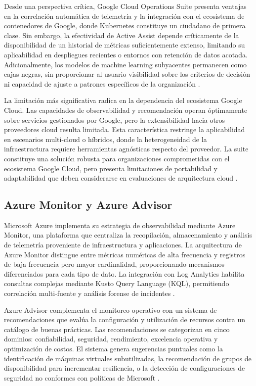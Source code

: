 Desde una perspectiva crítica, Google Cloud Operations Suite presenta ventajas en la correlación automática de telemetría y la integración con el ecosistema de contenedores de Google, donde Kubernetes constituye un ciudadano de primera clase. Sin embargo, la efectividad de Active Assist depende críticamente de la disponibilidad de un historial de métricas suficientemente extenso, limitando su aplicabilidad en despliegues recientes o entornos con retención de datos acotada. Adicionalmente, los modelos de machine learning subyacentes permanecen como cajas negras, sin proporcionar al usuario visibilidad sobre los criterios de decisión ni capacidad de ajuste a patrones específicos de la organización \parencite{GoogleCloud2026}.

La limitación más significativa radica en la dependencia del ecosistema Google Cloud. Las capacidades de observabilidad y recomendación operan óptimamente sobre servicios gestionados por Google, pero la extensibilidad hacia otros proveedores cloud resulta limitada. Esta característica restringe la aplicabilidad en escenarios multi-cloud o híbridos, donde la heterogeneidad de la infraestructura requiere herramientas agnósticas respecto del proveedor. La suite constituye una solución robusta para organizaciones comprometidas con el ecosistema Google Cloud, pero presenta limitaciones de portabilidad y adaptabilidad que deben considerarse en evaluaciones de arquitectura cloud \parencite{GoogleCloud2026}.

\subsection{Azure Monitor y Azure Advisor}

Microsoft Azure implementa su estrategia de observabilidad mediante Azure Monitor, una plataforma que centraliza la recopilación, almacenamiento y análisis de telemetría proveniente de infraestructura y aplicaciones. La arquitectura de Azure Monitor distingue entre métricas numéricas de alta frecuencia y registros de baja frecuencia pero mayor cardinalidad, proporcionando mecanismos diferenciados para cada tipo de dato. La integración con Log Analytics habilita consultas complejas mediante Kusto Query Language (KQL), permitiendo correlación multi-fuente y análisis forense de incidentes \parencite{Microsoft2026}.

Azure Advisor complementa el monitoreo operativo con un sistema de recomendaciones que evalúa la configuración y utilización de recursos contra un catálogo de buenas prácticas. Las recomendaciones se categorizan en cinco dominios: confiabilidad, seguridad, rendimiento, excelencia operativa y optimización de costos. El sistema genera sugerencias puntuales como la identificación de máquinas virtuales subutilizadas, la recomendación de grupos de disponibilidad para incrementar resiliencia, o la detección de configuraciones de seguridad no conformes con políticas de Microsoft \parencite{Microsoft2026}.

